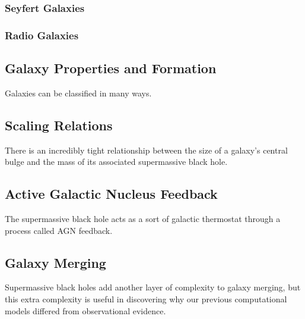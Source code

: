 \documentclass[12pt]{article}
\begin{document}
    \subsubsection*{Seyfert Galaxies}

    \subsubsection*{Radio Galaxies}

\subsection*{\bf Galaxy Properties and Formation}
Galaxies can be classified in many ways.

\subsection*{\bf Scaling Relations}
There is an incredibly tight relationship between the size of a galaxy's central
bulge and the mass of its associated supermassive black hole.

\subsection*{\bf Active Galactic Nucleus Feedback}
The supermassive black hole acts as a sort of galactic thermostat through a
process called AGN feedback.

\subsection *{\bf Galaxy Merging}
Supermassive black holes add another layer of complexity to galaxy merging, but
this extra complexity is useful in discovering why our previous computational
models differed from observational evidence.
\end{document}
